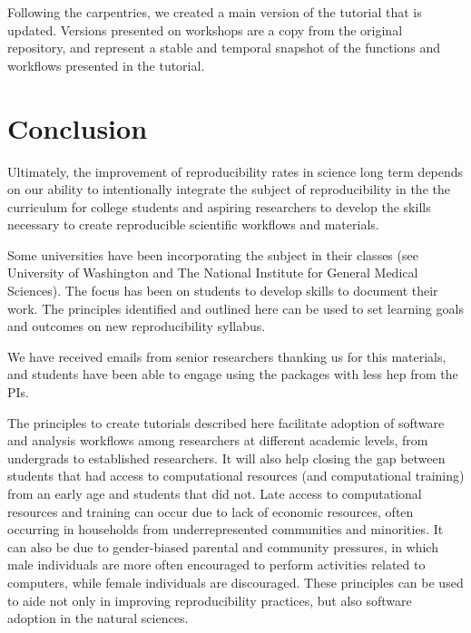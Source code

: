 \documentclass[12pt]{article}
\begin{document}
Following the carpentries, we created a main version of the tutorial that
is updated. Versions presented on workshops are a copy from the original repository,
and represent a stable and temporal snapshot of the functions and workflows presented
in the tutorial.


\section*{Conclusion}
\label{sec:conclusion}

Ultimately, the improvement of reproducibility rates in science long term depends
on our ability to intentionally integrate the subject of reproducibility in the
the curriculum for college students and aspiring researchers to develop the skills
necessary to create reproducible scientific workflows and materials.

Some universities have been incorporating the subject in their classes (see University
 of Washington and The National Institute for General Medical Sciences).
The focus has been on students to develop skills to document their work.
The principles identified and outlined here can be used to set learning goals and
 outcomes on new reproducibility syllabus.





We have received emails from senior researchers thanking us for this materials,
 and students have been able to engage using the packages with less hep from the PIs.

The principles to create tutorials described here facilitate adoption of software
 and analysis workflows among researchers at different academic levels, from undergrads
  to established researchers.
It will also help closing the gap between students that had access to computational
 resources (and computational training) from an early age and students that did not.
  Late access to computational resources and training can occur due to lack of
   economic resources, often occurring in households from underrepresented communities
    and minorities.
It can also be due to gender-biased parental and community pressures,
 in which male individuals are more often encouraged to perform activities related to computers,
  while female individuals are discouraged.
These principles can be used to aide not only in improving reproducibility practices,
 but also software adoption in the natural sciences.
\end{document}

